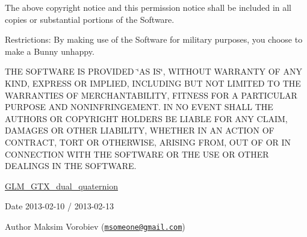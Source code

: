 The above copyright notice and this permission notice shall be included in all copies or substantial portions of the Software.

Restrictions\+: By making use of the Software for military purposes, you choose to make a Bunny unhappy.

T\+H\+E S\+O\+F\+T\+W\+A\+R\+E I\+S P\+R\+O\+V\+I\+D\+E\+D \char`\"{}\+A\+S I\+S\char`\"{}, W\+I\+T\+H\+O\+U\+T W\+A\+R\+R\+A\+N\+T\+Y O\+F A\+N\+Y K\+I\+N\+D, E\+X\+P\+R\+E\+S\+S O\+R I\+M\+P\+L\+I\+E\+D, I\+N\+C\+L\+U\+D\+I\+N\+G B\+U\+T N\+O\+T L\+I\+M\+I\+T\+E\+D T\+O T\+H\+E W\+A\+R\+R\+A\+N\+T\+I\+E\+S O\+F M\+E\+R\+C\+H\+A\+N\+T\+A\+B\+I\+L\+I\+T\+Y, F\+I\+T\+N\+E\+S\+S F\+O\+R A P\+A\+R\+T\+I\+C\+U\+L\+A\+R P\+U\+R\+P\+O\+S\+E A\+N\+D N\+O\+N\+I\+N\+F\+R\+I\+N\+G\+E\+M\+E\+N\+T. I\+N N\+O E\+V\+E\+N\+T S\+H\+A\+L\+L T\+H\+E A\+U\+T\+H\+O\+R\+S O\+R C\+O\+P\+Y\+R\+I\+G\+H\+T H\+O\+L\+D\+E\+R\+S B\+E L\+I\+A\+B\+L\+E F\+O\+R A\+N\+Y C\+L\+A\+I\+M, D\+A\+M\+A\+G\+E\+S O\+R O\+T\+H\+E\+R L\+I\+A\+B\+I\+L\+I\+T\+Y, W\+H\+E\+T\+H\+E\+R I\+N A\+N A\+C\+T\+I\+O\+N O\+F C\+O\+N\+T\+R\+A\+C\+T, T\+O\+R\+T O\+R O\+T\+H\+E\+R\+W\+I\+S\+E, A\+R\+I\+S\+I\+N\+G F\+R\+O\+M, O\+U\+T O\+F O\+R I\+N C\+O\+N\+N\+E\+C\+T\+I\+O\+N W\+I\+T\+H T\+H\+E S\+O\+F\+T\+W\+A\+R\+E O\+R T\+H\+E U\+S\+E O\+R O\+T\+H\+E\+R D\+E\+A\+L\+I\+N\+G\+S I\+N T\+H\+E S\+O\+F\+T\+W\+A\+R\+E.

\hyperlink{group__gtx__dual__quaternion}{G\+L\+M\+\_\+\+G\+T\+X\+\_\+dual\+\_\+quaternion}

\begin{DoxyDate}{Date}
2013-\/02-\/10 / 2013-\/02-\/13 
\end{DoxyDate}
\begin{DoxyAuthor}{Author}
Maksim Vorobiev (\href{mailto:msomeone@gmail.com}{\tt msomeone@gmail.\+com}) 
\end{DoxyAuthor}
